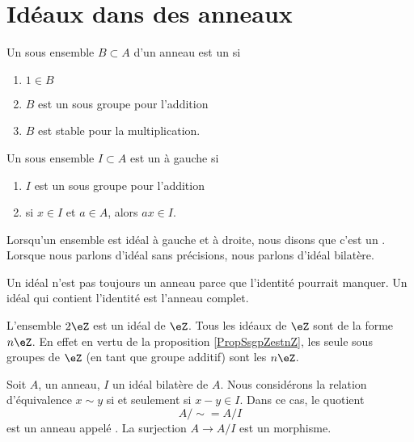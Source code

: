 \section{Idéaux dans des anneaux}

\begin{definition}
    Un sous ensemble \( B\subset A\) d'un anneau est un  si
    \begin{enumerate}
        \item
            \( 1\in B\)
        \item
            \( B\) est un sous groupe pour l'addition
        \item
            \( B\) est stable pour la multiplication.
    \end{enumerate}
    Un sous ensemble \( I\subset A\) est un  à gauche si
    \begin{enumerate}
        \item
            \( I\) est un sous groupe pour l'addition
        \item
            si \( x\in I\) et \( a\in A\), alors \( ax\in I\).
    \end{enumerate}
\end{definition}

Lorsqu'un ensemble est idéal à gauche et à droite, nous disons que c'est un . Lorsque nous parlons d'idéal sans précisions, nous parlons d'idéal bilatère.

\begin{remark}
    Un idéal n'est pas toujours un anneau parce que l'identité pourrait manquer. Un idéal qui contient l'identité est l'anneau complet.
\end{remark}

\begin{example}
    L'ensemble \( 2\eZ\) est un idéal de \( \eZ\). Tous les idéaux de \( \eZ\) sont de la forme \( n\eZ\). En effet en vertu de la proposition \ref{PropSsgpZestnZ}, les seule sous groupes de \( \eZ\) (en tant que groupe additif) sont les \( n\eZ\).
\end{example}

Soit \( A\), un anneau, \( I\) un idéal bilatère de \( A\). Nous considérons la relation d'équivalence \( x\sim y\) si et seulement si \( x-y\in I\). Dans ce cas, le quotient
\begin{equation}
    A/\sim=A/I
\end{equation}
est un anneau appelé . La surjection \( A\to A/I\) est un morphisme.

